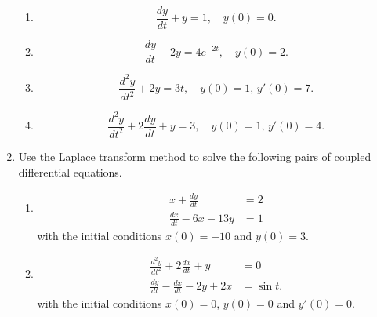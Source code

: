 \documentclass[a4paper]{amsart}
\begin{document}
\begin{enumerate}
\begin{enumerate}
\item
$$\frac{dy}{dt} + y = 1, \quad y(0)=0 .$$

\item
$$\frac{dy}{dt} - 2y = 4 e^{-2t}, \quad y(0)=2.$$

\item
$$\frac{d^2y}{dt^2} + 2y = 3t, \quad y(0)=1, \, y'(0)=7.$$

\item
$$\frac{d^2y}{dt^2} +2 \frac{dy}{dt} + y = 3, \quad y(0)=1, \, y'(0)=4.$$
\end{enumerate}

\bigskip

\item
Use the Laplace transform method to solve the following pairs of coupled differential equations.

\begin{enumerate}
\item
\begin{align*}
x + \frac{dy}{dt} &=2 \\
\frac{dx}{dt} -6x - 13 y &=1
\end{align*}
with the initial conditions $x(0)=-10$ and $y(0)=3$.

\item
\begin{align*}
\frac{d^2y}{dt^2} + 2 \frac{dx}{dt} + y &=0 \\
\frac{dy}{dt} - \frac{dx}{dt} - 2y + 2x &= \sin t.
\end{align*}
with the initial conditions $x(0)=0$, $y(0)=0$ and $y'(0)=0$.	
\end{enumerate}


\end{enumerate}
\end{document}
